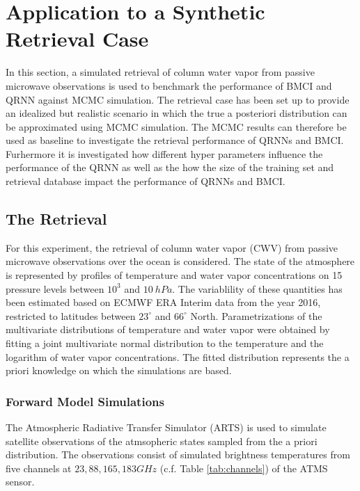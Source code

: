 \documentclass[journal abbreviation, manuscript]{copernicus}
\begin{document}
\section{Application to a Synthetic Retrieval Case}
\label{sec:synthetic}

In this section, a simulated retrieval of column water vapor from passive
microwave observations is used to benchmark the performance of BMCI and QRNN
against MCMC simulation. The retrieval case has been set up to provide an
idealized but realistic scenario in which the true a posteriori distribution can
be approximated using MCMC simulation. The MCMC results can therefore be used as
baseline to investigate the retrieval performance of QRNNs and BMCI. Furhermore
it is investigated how different hyper parameters influence the performance of
the QRNN as well as the how the size of the training set and retrieval database
impact the performance of QRNNs and BMCI.

\subsection{The Retrieval}

   For this experiment, the retrieval of column water vapor (CWV) from passive
   microwave observations over the ocean is considered. The state of the
   atmosphere is represented by profiles of temperature and water vapor
   concentrations on 15 pressure levels between $10^3$ and $10\:\unit{hPa}$. The
   variablility of these quantities has been estimated based on ECMWF ERA
   Interim data \citep{era_interim} from the year 2016, restricted to latitudes
   between $23^\circ$ and $66^\circ$ North. Parametrizations of the multivariate
   distributions of temperature and water vapor were obtained by fitting a joint
   multivariate normal distribution to the temperature and the logarithm of
   water vapor concentrations. The fitted distribution represents the a priori
   knowledge on which the simulations are based.

\subsubsection{Forward Model Simulations}

   The Atmospheric Radiative Transfer Simulator (ARTS) \citep{arts} is used to
   simulate satellite observations of the atmsopheric states sampled from the a
   priori distribution. The observations consist of simulated brightness
   temperatures from five channels at $23, 88, 165, 183 \unit{GHz}$
   (c.f. Table \ref{tab:channels}) of the ATMS sensor.
\end{document}
